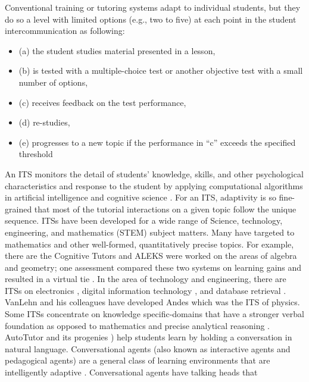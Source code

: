 \documentclass[letterpaper%
, twoside%
, 12pt%
,these%
, english%
,creativecommons,hyperref, withAlgo2e %
]{thETS}
\begin{document}
\begin{introduction}
Conventional training or tutoring systems adapt to individual students, but they do so a level with limited options (e.g., two to five) at
each point in the student intercommunication as following:
\begin{itemize}
	\item  (a) the student  studies material presented in a
	lesson,
	\item (b) is tested with a multiple-choice test or another objective test with a small number of options,
	\item (c)
	receives feedback on the test performance,
	\item (d) re-studies,
	\item (e) progresses to a new topic if the performance in “c” exceeds the specified threshold
\end{itemize}   
An ITS monitors the detail of students' knowledge, skills, and other psychological
characteristics  and response to the student by applying computational
algorithms in artificial intelligence and cognitive science \cite{Woolf2009}\cite{Sottilare}\cite{VanLehn2006}.
For an ITS, adaptivity is so fine-grained that most of the tutorial interactions on a given topic follow the unique sequence.
ITSs have been developed for a wide range of Science, technology, engineering, and mathematics (STEM)
subject matters. Many have targeted to mathematics and
other well-formed, quantitatively precise topics. For example, there are the
Cognitive Tutors \cite{Aleven2009}\cite{Koedinger1997}\cite{Ritter2007}  and ALEKS \cite{Falmagne2013} were worked on the
areas of algebra and geometry; one assessment compared these two systems on
learning gains and resulted in a virtual tie \cite{Sabo2013}. In the area of technology and engineering, there
are ITSs on electronics \cite{Lesgold1992}\cite{Dzikovska2014}, digital information
technology \cite{Fletcher2012},
and database retrieval \cite{Mitrovic2007}.  VanLehn and his colleagues have developed Andes \cite{VanLehn2011} which was the ITS of physics.
Some ITSs concentrate on knowledge specific-domains that have a
stronger verbal foundation as opposed to mathematics
and precise analytical reasoning \cite{Johnson2016}. AutoTutor and its progenies \cite{Graesser2016}\cite{Nye2014a}\cite{Nye2014b}) help students learn by holding a conversation in natural language. Conversational agents (also known as interactive agents and
pedagogical agents) are a general class of learning environments that are intelligently adaptive \cite{Atkinson2002}\cite{Craig2002}\cite{Johnson2000}\cite{McNara2010}\cite{Moreno2001}. Conversational agents have talking heads that

\end{introduction}
\end{document}
